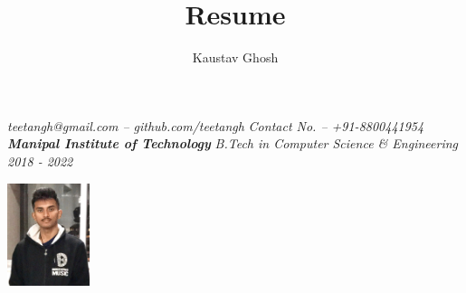 \documentclass{article}
\makeatletter
\renewcommand{\maketitle}{
    \begin{flushleft}        
        {\huge\rmfamily
        \theauthor}\newline
        \vspace{0.1em}
        \textit{teetangh@gmail.com -- github.com/teetangh}\newline
        \textit{Contact No. -- +91-8800441954}\newline
        \textbf{\emph{Manipal Institute of Technology}}\newline
        \textit{B.Tech in Computer Science \& Engineering}
        \textit{2018 - 2022}\newline
    \end{flushleft}

}
\makeatother
\begin{document}
    


\begin{multicols}{2}
    \title{Resume}
        \author{Kaustav Ghosh}
    \maketitle
    \begin{flushright}
        \includegraphics[height=3cm]{kaustav2.jpeg}
    \end{flushright}
\end{multicols}
\end{document}
